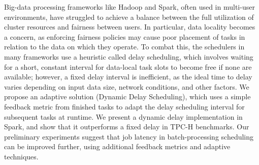 Big-data processing frameworks like Hadoop and Spark, often used in multi-user environments, 
have struggled to achieve a balance between the full utilization of cluster resources and fairness between users. 
In particular, data locality becomes a concern, as enforcing fairness policies may cause poor placement of tasks in relation to the data on which they operate. 
To combat this, the schedulers in many frameworks use a heuristic called delay scheduling, 
which involves waiting for a short, constant interval for data-local task slots to become free if none are available; 
however, a fixed delay interval is inefficient, as the ideal time to delay varies depending on input data size, network conditions, and other factors. 
We propose an adaptive solution (Dynamic Delay Scheduling), which uses a simple feedback metric from finished tasks to adapt the delay scheduling interval for 
subsequent tasks at runtime. We present a dynamic delay implementation in Spark, and show that it outperforms a fixed delay in TPC-H benchmarks. 
Our preliminary experiments suggest that job latency in batch-processing scheduling can be improved further, using additional feedback metrics and adaptive techniques.
